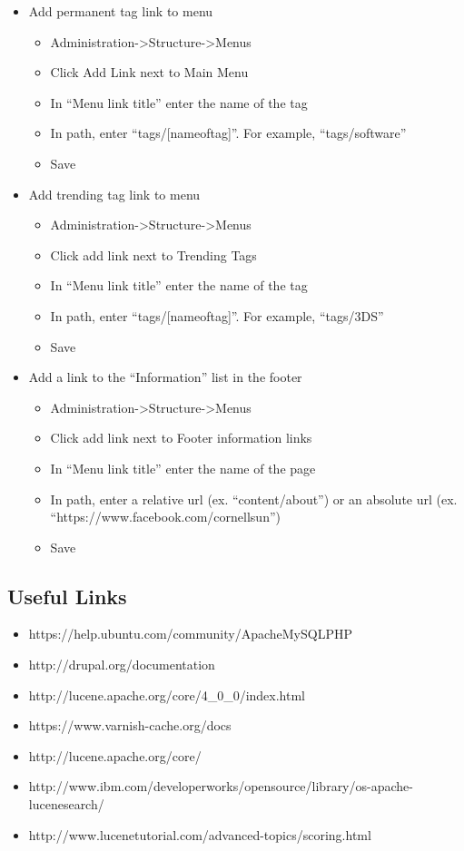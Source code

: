 \documentclass[11pt]{article} %
\begin{document}
\begin{itemize}
\begin{itemize}
	\end{itemize}
\item Add permanent tag link to menu
	\begin{itemize}
	\itemindent 10pt
	\item Administration->Structure->Menus
	\item Click Add Link next to Main Menu
	\item In “Menu link title” enter the name of the tag
	\item In path, enter “tags/[nameoftag]”. For example, “tags/software”
	\item Save
	\end{itemize}
\item Add trending tag link to menu
	\begin{itemize}
	\itemindent 10pt
	\item Administration->Structure->Menus
	\item Click add link next to Trending Tags
	\item In “Menu link title” enter the name of the tag
	\item In path, enter “tags/[nameoftag]”. For example, “tags/3DS”
	\item Save
	\end{itemize}
\item Add a link to the “Information” list in the footer
	\begin{itemize}
	\itemindent 10pt
	\item Administration->Structure->Menus
	\item Click add link next to Footer information links
	\item In “Menu link title” enter the name of the page
	\item In path, enter a relative url (ex. “content/about”) or an absolute url (ex. “https://www.facebook.com/cornellsun”)
	\item Save
	\end{itemize}
\end{itemize}

\subsection{Useful Links}

\begin{itemize}
\item https://help.ubuntu.com/community/ApacheMySQLPHP
\item http://drupal.org/documentation
\item http://lucene.apache.org/core/4\_0\_0/index.html
\item https://www.varnish-cache.org/docs
\item http://lucene.apache.org/core/
\item http://www.ibm.com/developerworks/opensource/library/os-apache-lucenesearch/
\item http://www.lucenetutorial.com/advanced-topics/scoring.html
\end{itemize}
\end{document}
